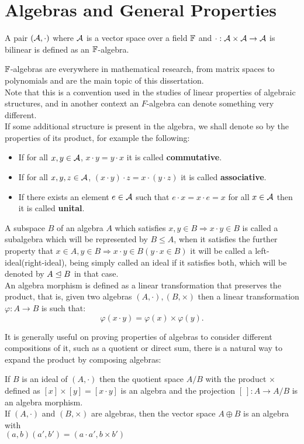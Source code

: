 \section{Algebras and General Properties}
\begin{defi}
	A pair $(\mathcal{A},\cdot)$ where $\mathcal{A}$ is a vector space over a field $\mathbb{F}$ and $\cdot:\mathcal{A}\times\mathcal{A}\rightarrow \mathcal{A}$ is bilinear is defined as an $\mathbb{F}$-algebra.
	\label{genalgebra}
\end{defi}
$\mathbb{F}$-algebras are everywhere in mathematical research, from matrix spaces to polynomials and are the main topic of this dissertation.\\
Note that this is a convention used in the studies of linear properties of algebraic structures, and in another context an $F$-algebra can denote something very different.\\
If some additional structure is present in the algebra, we shall denote so by the properties of its product, for example the following:
\begin{itemize}
	\item If for all $x,y \in \mathcal{A}$, $x\cdot y = y \cdot x$ it is called \textbf{commutative}.
	\item If for all $x,y,z \in \mathcal{A}$, $(x\cdot y)\cdot z = x \cdot(y \cdot z)$ it is called \textbf{associative}.
	\item If there exists an element $e \in \mathcal{A}$ such that $e \cdot x = x \cdot e = x$ for all $x \in \mathcal{A}$ then it is called \textbf{unital}.
\end{itemize}
\begin{defi}
A subspace $B$ of an algebra $A$ which satisfies $x,y \in B \Rightarrow x\cdot y \in B$ is called a subalgebra which will be represented by $B\le A$, when it satisfies the further property that $x \in A, y \in B \Rightarrow x\cdot y \in B(y\cdot x\in B)$ it will be called a left-ideal(right-ideal), being simply called an ideal if it satisfies both, which will be denoted by $A\trianglelefteq B$ in that case.\\
An algebra morphism is defined as a linear transformation that preserves the product, that is, given two algebras $(A,\cdot),(B,\times)$ then a linear transformation $\varphi:A\rightarrow B$ is such that:
	$$\varphi(x \cdot y) = \varphi(x) \times \varphi(y).$$
\label{12subalgebra}
\end{defi}
It is generally useful on proving properties of algebras to consider different compositions of it, such as a quotient or direct sum, there is a natural way to expand the product by composing algebras:
\begin{prop}
If $B$ is an ideal of $(A,\cdot)$ then the quotient space $A/B$ with the product $\times$ defined as $[x] \times [y] =  [x\cdot y]$ is an algebra and the projection $[\ ]:A\rightarrow A/B$ is an algebra morphism.\\
If $(A,\cdot)$ and $(B,\times)$ are algebras, then the vector space $A\oplus B$ is an algebra with\\ $(a,b)(a',b')=(a\cdot a',b \times b')$
\label{genquotient}
\end{prop}
